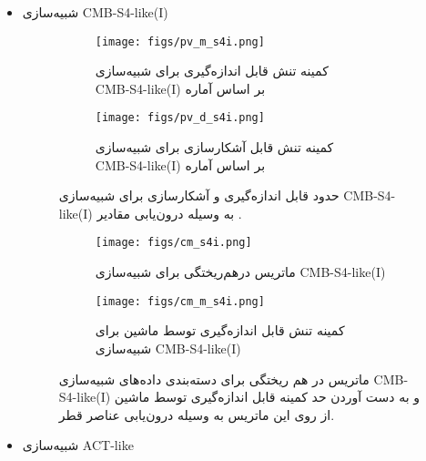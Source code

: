 \begin{itemize}
	
	
	\item 
	شبیه‌سازی
	CMB-S4-like(I)
	
	\begin{figure}[H]
		\centering
		\begin{subfigure}{0.5\textwidth}
			\centering
			\texttt{[image: figs/pv\_m\_s4i.png]}
			\caption{   کمینه تنش قابل اندازه‌گیری برای شبیه‌سازی 
				\\	CMB-S4-like(I)
				بر اساس آماره }
		\end{subfigure}%
		\begin{subfigure}{0.5\textwidth}
			\centering
			\texttt{[image: figs/pv\_d\_s4i.png]}
			\caption{  کمینه تنش قابل آشکارسازی برای شبیه‌سازی 
				\\ CMB-S4-like(I)
				بر اساس آماره  }
		\end{subfigure}
		
		\caption{حدود قابل اندازه‌گیری و آشکارسازی برای شبیه‌سازی 
			CMB-S4-like(I)
			به وسیله درون‌یابی مقادیر 
			.}
		\label{fig:s4i_cm}
	\end{figure}
	\begin{figure}[H]
		\centering
		\begin{subfigure}{\textwidth}
			\centering
			\texttt{[image: figs/cm\_s4i.png]}
			\caption{  ماتریس درهم‌ریختگی برای شبیه‌سازی 
				CMB-S4-like(I) }
		\end{subfigure}%
		
		\begin{subfigure}{0.5\linewidth}
			\centering
			\texttt{[image: figs/cm\_m\_s4i.png]}
			\caption{  کمینه تنش قابل اندازه‌گیری توسط ماشین برای شبیه‌سازی 
				CMB-S4-like(I) }
		\end{subfigure}
		
		\caption{ماتریس در هم ریختگی برای دسته‌بندی داده‌های شبیه‌سازی
			CMB-S4-like(I)
			و به دست آوردن حد کمینه قابل اندازه‌گیری توسط ماشین از روی این ماتریس به وسیله درون‌یابی عناصر قطر.}
		\label{fig:s4i_pv}
	\end{figure}
	
	
	
	
	
	\item 
	شبیه‌سازی  ACT-like
	

\end{itemize}

